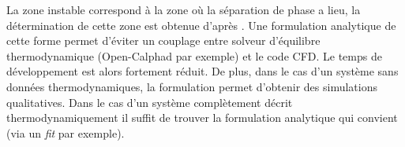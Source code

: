
La zone instable correspond à la zone où la séparation de phase a lieu, la détermination de cette zone est obtenue d'après \cite{aursand_spinodal_2017}. Une formulation analytique de cette forme permet d'éviter un couplage entre solveur d’équilibre thermodynamique (Open-Calphad par exemple) et le code CFD. Le temps de développement est alors fortement réduit. De plus, dans le cas d'un système sans données thermodynamiques, la formulation permet d'obtenir des simulations qualitatives. Dans le cas d'un système complètement décrit thermodynamiquement il suffit de trouver la formulation analytique qui convient (via un \textit{fit} par exemple). 




